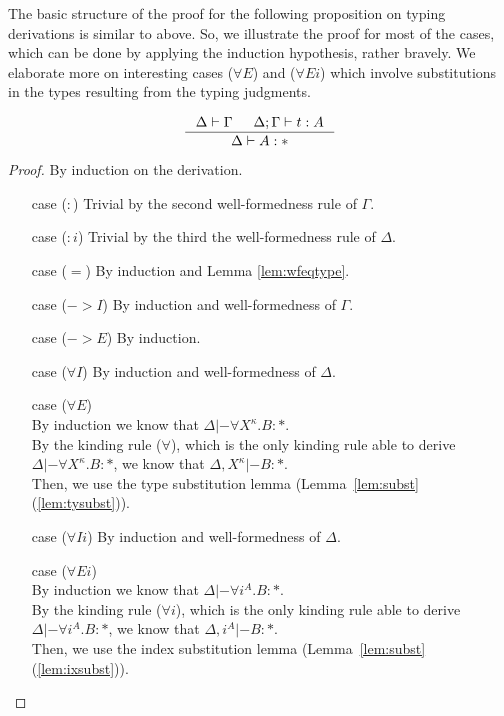 The basic structure of the proof for the following proposition on typing
derivations is similar to above. So, we illustrate the proof for most of
the cases, which can be done by applying the induction hypothesis, rather
bravely. We elaborate more on interesting cases ($\forall E$) and ($\forall Ei$)
which involve substitutions in the types resulting from the typing judgments.
\begin{proposition}
\label{prop:wftype}
\[ \inference{ \Delta |- \Gamma & \Delta;\Gamma |- t : A}{ \Delta |- A : * }
\]
\end{proposition}
\begin{proof} By induction on the derivation.
\begin{itemize}
\item[case] ($:$)
	Trivial by the second well-formedness rule of $\Gamma$.
\item[case] ($:i$)
	Trivial by the third the well-formedness rule of $\Delta$.
\item[case] ($=$)
	By induction and Lemma \ref{lem:wfeqtype}.
\item[case] ($->$$I$)
	By induction and well-formedness of $\Gamma$.
\item[case] ($->$$E$)
	By induction.
\item[case] ($\forall I$)
	By induction and well-formedness of $\Delta$.
\item[case] ($\forall E$)\\
	By induction we know that $\Delta |- \forall X^\kappa.B : *$.\\
	By the kinding rule ($\forall$), which is the only kinding rule
	able to derive $\Delta |- \forall X^\kappa.B : *$, we know
	that $\Delta,X^\kappa |- B : *$.\\
	Then, we use the type substitution lemma
	(Lemma~\ref{lem:subst}(\ref{lem:tysubst})).
\item[case] ($\forall Ii$)
	By induction and well-formedness of $\Delta$.
\item[case] ($\forall Ei$)\\
	By induction we know that $\Delta |- \forall i^A.B : *$.\\
	By the kinding rule ($\forall i$), which is the only kinding rule
	able to derive $\Delta |- \forall i^A.B : *$, we know
	that $\Delta,i^A |- B : *$.\\
	Then, we use the index substitution lemma
	(Lemma~\ref{lem:subst}(\ref{lem:ixsubst})).\qedhere
\end{itemize}
\end{proof}

